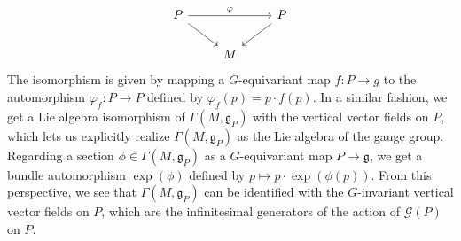\documentclass[psamsfonts, 12pt]{amsart}
\theoremstyle{definition}
\theoremstyle{remark}
\newcommand{\g}{\mathfrak{g}}
\begin{document}
\[\begin{tikzcd}
P \ar[dr] \ar[rr, "\varphi"] && P \ar[dl] \\
& M
\end{tikzcd}\]
The isomorphism is given by mapping a $G$-equivariant map $f : P \to g$
to the automorphism $\varphi_f : P \to P$ defined by $\varphi_f(p) = p\cdot f(p)$.
In a similar fashion, we get a Lie algebra isomorphism of $\Gamma(M,\g_P)$ with
the vertical vector fields on $P$, which lets us explicitly realize
$\Gamma(M,\g_P)$ as the Lie algebra of the gauge group. Regarding a section
$\phi \in \Gamma(M,\g_P)$ as a $G$-equivariant map $P \to \g$, we get
a bundle automorphism $\exp(\phi)$ defined by $p\mapsto p\cdot\exp(\phi(p))$. From
this perspective, we see that $\Gamma(M,\g_P)$ can be identified with the $G$-invariant
vertical vector fields on $P$, which are the infinitesimal generators of the action
of $\mathscr{G}(P)$ on $P$. \\
\end{document}
